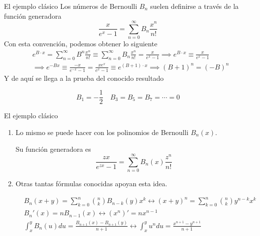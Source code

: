 \documentclass{beamer}
\begin{document}
  \begin{frame}{El ejemplo clásico}
    Los números de Bernoulli $B_n$ suelen definirse a través de la función generadora
      \begin{equation*}
        \frac{x}{e^x - 1} = \sum_{n=0}^\infty B_n \frac{x^n}{n!}
      \end{equation*} 
      Con esta convención, podemos obtener lo siguiente
      \begin{align*}
        & e^{B \cdot x} = \sum_{n=0}^\infty B^n \frac{x^n}{n!} \equiv \sum_{n=0}^\infty B_n \frac{x^n}{n!} = \frac{x}{e^x - 1} \implies e^{B \cdot x} \equiv \frac{x}{e^x - 1}\\
        & \implies e^{-Bx} \equiv \frac{-x}{e^{-x}-1} = \frac{xe^x}{e^x-1} \equiv e^{(B+1) \cdot x} \implies (B+1)^n = (-B)^n
      \end{align*}
      Y de aquí se llega a la prueba del conocido resultado
      \begin{block}{}
        \begin{equation*}
        B_1 = -\frac{1}{2} \quad B_3 = B_5 = B_7 = \cdots = 0
      \end{equation*}
      \end{block}
  \end{frame}

  \begin{frame}{El ejemplo clásico}
    \begin{enumerate}
      \item Lo mismo se puede hacer con los polinomios de Bernoulli $B_n(x)$. 
      
      Su función generadora es
      \begin{equation*}
        \frac{zx}{e^{zx} - 1} = \sum_{n=0}^\infty B_n(x) \frac{z^n}{n!}
      \end{equation*}
      \item Otras tantas fórmulas conocidas apoyan esta idea.
      \begin{block}{}
        \begin{align*}
        &B_n(x + y) = \sum_{k=0}^n \binom{n}{k} B_{n-k}(y)x^k \leftrightarrow (x + y)^n = \sum_{k=0}^n \binom{n}{k} y^{n-k}x^k\\
        &B_n'(x) = nB_{n-1}(x) \leftrightarrow (x^n)' = nx^{n-1}\\
        &\int_{x}^{y} B_n(u) du = \frac{B_{n+1}(x) - B_{n+1}(y)}{n+1} \leftrightarrow \int_{x}^{y} u^n du = \frac{x^{n+1} - y^{n+1}}{n+1}
        \end{align*}
      \end{block}
    \end{enumerate}
  \end{frame}
\end{document}
